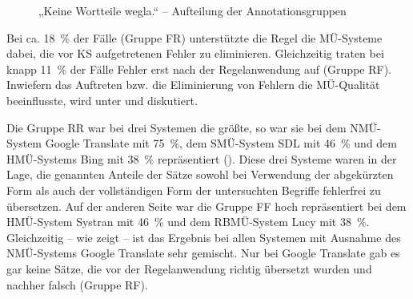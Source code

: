 \begin{figure}

\caption{\label{fig:05:127}„Keine Wortteile wegla.“ -- Aufteilung der Annotationsgruppen   }
\end{figure}

Bei ca. 18~\% der Fälle (Gruppe FR) unterstützte die Regel die MÜ-Systeme dabei, die vor KS aufgetretenen Fehler zu eliminieren. Gleichzeitig traten bei knapp 11~\% der Fälle Fehler erst nach der Regelanwendung auf (Gruppe RF). Inwiefern das Auftreten bzw. die Eliminierung von Fehlern die MÜ-Qualität beeinflusste, wird unter  und  diskutiert.


Die Gruppe RR war bei drei Systemen die größte, so war sie bei dem NMÜ-System Google Translate mit 75~\%, dem SMÜ-System SDL mit 46~\% und dem HMÜ-Systems Bing mit 38~\% repräsentiert (). Diese drei Systeme waren in der Lage, die genannten Anteile der Sätze sowohl bei Verwendung der abgekürzten Form als auch der vollständigen Form der untersuchten Begriffe fehlerfrei zu übersetzen. Auf der anderen Seite war die Gruppe FF hoch repräsentiert bei dem HMÜ-System Systran mit 46~\% und dem RBMÜ-System Lucy mit 38~\%. Gleichzeitig -- wie  zeigt -- ist das Ergebnis bei allen Systemen mit Ausnahme des NMÜ-Systems Google Translate sehr gemischt. Nur bei Google Translate gab es gar keine Sätze, die vor der Regelanwendung richtig übersetzt wurden und nachher falsch (Gruppe RF).


